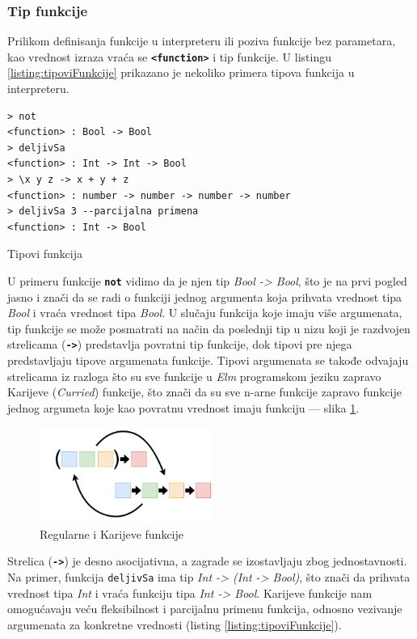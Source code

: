 \documentclass[12pt,oneside]{memoir}
\begin{document}
\subsubsection{Tip funkcije}
Prilikom definisanja funkcije u interpreteru ili
poziva funkcije bez parametara, kao vrednost izraza vraća se \texttt{\textbf{<function>}} 
i tip funkcije. U listingu  \ref{listing:tipoviFunkcije} prikazano je nekoliko primera 
tipova funkcija u interpreteru.
\begin{listing}[h]
\begin{verbatim}
> not
<function> : Bool -> Bool
> deljivSa
<function> : Int -> Int -> Bool
> \x y z -> x + y + z
<function> : number -> number -> number -> number
> deljivSa 3 --parcijalna primena
<function> : Int -> Bool
\end{verbatim}
\caption{Tipovi funkcija}
\label{listing:tipoviFunkcije}
\end{listing} 
  
U primeru funkcije \texttt{\textbf{not}} vidimo da je njen tip \emph{Bool -> Bool},
što je na prvi pogled jasno i znači da se radi o funkciji jednog argumenta koja
prihvata vrednost tipa \emph{Bool} i vraća vrednost tipa \emph{Bool}. U slučaju
funkcija koje imaju više argumenata, tip funkcije se može
posmatrati na način da poslednji tip u nizu koji je razdvojen strelicama
(\texttt{\textbf{->}}) predstavlja povratni tip funkcije, dok tipovi pre njega 
predstavljaju tipove argumenata funkcije. Tipovi argumenata se takođe odvajaju strelicama
iz razloga što su sve funkcije u \emph{Elm} programskom jeziku zapravo Karijeve (\emph{Curried}) funkcije,
što znači da su sve n-arne funkcije zapravo funkcije jednog argumeta
koje kao povratnu vrednost imaju funkciju --- slika \ref{fig:currying}.
\begin{figure}[!h]
  \centering
  \includegraphics[width=0.5\textwidth]{currying.png}
  \caption{Regularne i Karijeve funkcije}
  \label{fig:currying}
\end{figure}
Strelica (\texttt{\textbf{->}}) je desno asocijativna, a zagrade se izostavljaju zbog
jednostavnosti. Na primer, funkcija \texttt{deljivSa} ima tip \emph{Int -> (Int -> Bool)},
što znači da prihvata vrednost tipa \emph{Int} i vraća funkciju tipa \emph{Int -> Bool}.
Karijeve funkcije nam omogućavaju veću fleksibilnost i parcijalnu primenu funkcija, 
odnosno vezivanje argumenata za konkretne vrednosti (listing \ref{listing:tipoviFunkcije}).
\end{document}
